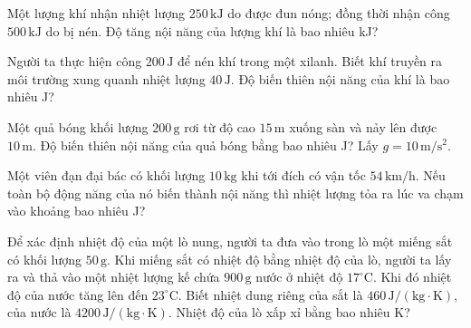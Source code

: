 \begin{ex}
Một lượng khí nhận nhiệt lượng $250\,\mathrm{kJ}$ do được đun nóng; đồng thời nhận công $500\,\mathrm{kJ}$ do bị nén. Độ tăng nội năng của lượng khí là bao nhiêu kJ?
\end{ex}
\begin{ex}
Người ta thực hiện công $200\,\mathrm{J}$ để nén khí trong một xilanh. Biết khí truyền ra môi trường xung quanh nhiệt lượng $40\,\mathrm{J}$. Độ biến thiên nội năng của khí là bao nhiêu J?
\end{ex}
\begin{ex}
Một quả bóng khối lượng $200\,\mathrm{g}$ rơi từ độ cao $15\,\mathrm{m}$ xuống sàn và nảy lên được $10\,\mathrm{m}$. Độ biến thiên nội năng của quả bóng bằng bao nhiêu J? Lấy $g=10\,\mathrm{m/s^2}$.
\end{ex}
\begin{ex}
Một viên đạn đại bác có khối lượng $10\,\mathrm{kg}$ khi tới đích có vận tốc $54\,\mathrm{km/h}$. Nếu toàn bộ động năng của nó biến thành nội năng thì nhiệt lượng tỏa ra lúc va chạm vào khoảng bao nhiêu J?
\end{ex}
\begin{ex}
Để xác định nhiệt độ của một lò nung, người ta đưa vào trong lò một miếng sắt có khối lượng $50\,\mathrm{g}$. Khi miếng sắt có nhiệt độ bằng nhiệt độ của lò, người ta lấy ra và thả vào một nhiệt lượng kế chứa $900\,\mathrm{g}$ nước ở nhiệt độ $17^\circ\mathrm{C}$. Khi đó nhiệt độ của nước tăng lên đến $23^\circ\mathrm{C}$. Biết nhiệt dung riêng của sắt là $460\,\mathrm{J/(kg\cdot K)}$, của nước là $4200\,\mathrm{J/(kg\cdot K)}$. Nhiệt độ của lò xấp xỉ bằng bao nhiêu K?
\end{ex}
